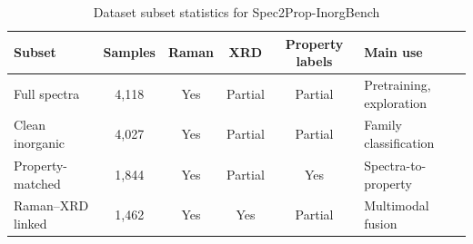 \begin{table}[htbp]
\caption{Dataset subset statistics for Spec2Prop-InorgBench}
\label{tab:dataset_subsets}
\centering
\begin{tabularx}{\textwidth}{l c c c c X}
\toprule
\textbf{Subset} & \textbf{Samples} & \textbf{Raman} & \textbf{XRD} & \textbf{Property labels} & \textbf{Main use} \\
\midrule
Full spectra & 4,118 & Yes & Partial & Partial & Pretraining, exploration \\
Clean inorganic & 4,027 & Yes & Partial & Partial & Family classification \\
Property-matched & 1,844 & Yes & Partial & Yes & Spectra-to-property \\
Raman--XRD linked & 1,462 & Yes & Yes & Partial & Multimodal fusion \\
\bottomrule
\end{tabularx}
\end{table}
